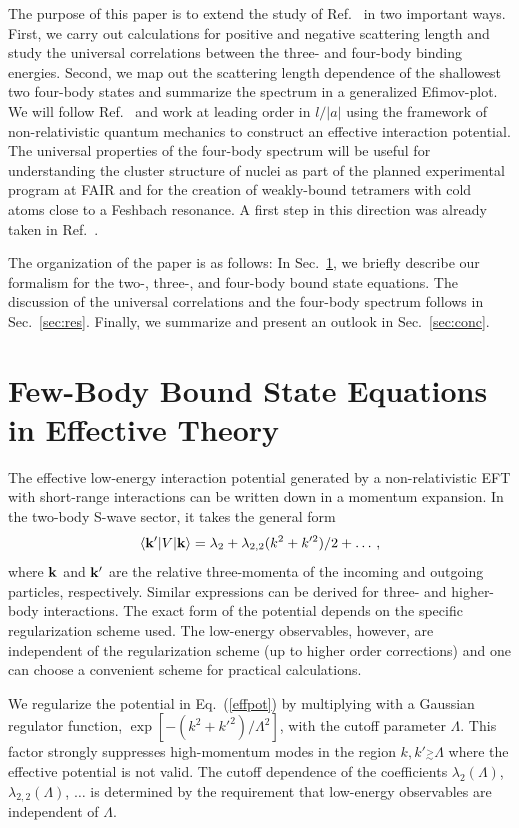 \documentclass[prc,preprint,showpacs,tightenlines,%
nofootinbib]{revtex4}
\newcommand{\beq}{\begin{equation}}
\newcommand{\eeq}{\end{equation}}
\newcommand{\simgt}{\stackrel{>}{{}_\sim}}
\begin{document}
The purpose of this paper is to extend the study of 
Ref.~\cite{Platter04} in two important ways. First, we carry out
calculations for positive and negative scattering length and 
study the universal correlations between the three- and four-body
binding energies. Second, we map out the scattering 
length dependence of the shallowest two four-body states and 
summarize the spectrum in a generalized Efimov-plot. 
We will follow Ref.~\cite{Platter04} and
work at leading order in $l/|a|$ using the framework of 
non-relativistic quantum mechanics to construct an effective interaction 
potential. The universal properties of the four-body spectrum
will be useful for understanding the cluster structure 
of nuclei \cite{Mar06} as part of the planned experimental program at FAIR
and for the creation of weakly-bound tetramers with cold atoms
close to a Feshbach resonance. A first step in this direction was 
already taken in  Ref.~\cite{Chin05}.

The organization of the paper is as follows: In Sec.~\ref{sec:effT},
we briefly describe our formalism for the two-, three-, and four-body
bound state equations. 
The discussion of the universal correlations and the four-body
spectrum follows in Sec.~\ref{sec:res}. Finally, we summarize and
present an outlook in Sec.~\ref{sec:conc}.


\section{Few-Body Bound State Equations in Effective Theory}
\label{sec:effT}
%
The effective low-energy interaction potential generated by a 
non-relativistic EFT with short-range interactions can be written
down in a momentum expansion. In the two-body S-wave sector,
it takes the general form
\beq
\langle {\bf k'} | V | {\bf k} \rangle =
\lambda_2 + \lambda_{2,2} (k^2+k'^2)/2 +\ldots\,,
\label{effpot}
\eeq
where ${\bf k}$ and ${\bf k'}$ are the relative three-momenta of
the incoming and outgoing particles, respectively.
Similar expressions can be derived for three- and higher-body 
interactions. The exact form of the potential depends on the specific
regularization scheme used. The low-energy observables, however, 
are independent of the regularization scheme (up to higher order corrections)
and one can choose a convenient scheme for practical calculations.

We regularize the potential in Eq.~(\ref{effpot}) by multiplying with 
a Gaussian regulator function, $\exp[-(k^2+k'^2)/\Lambda^2]$, with
the cutoff parameter $\Lambda$. This factor strongly suppresses 
high-momentum modes in the region $k,k' \simgt \Lambda$ where the 
effective potential is not valid. 
The cutoff dependence of the coefficients $\lambda_2(\Lambda)$, 
$\lambda_{2,2}(\Lambda)$, $\ldots$ is determined by the requirement
that low-energy observables are independent of $\Lambda$. 
\end{document}
